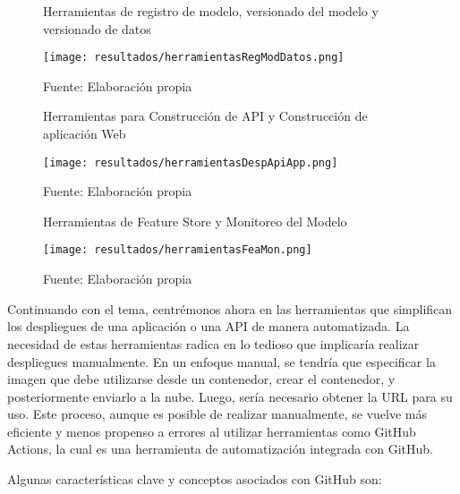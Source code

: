 \newpage

\begin{figure}[h]
	\centering
	\caption{Herramientas de registro de modelo, versionado del modelo y versionado de datos}
	\texttt{[image: resultados/herramientasRegModDatos.png]}
	\caption*{\footnotesize Fuente: Elaboración propia}
	\label{fig:figuraHerramientasRegModDatos}
\end{figure}

\begin{figure}[h]
	\centering
	\caption{Herramientas para Construcción de API y Construcción de aplicación Web}
	\texttt{[image: resultados/herramientasDespApiApp.png]}
	\caption*{\footnotesize Fuente: Elaboración propia}
	\label{fig:figuraHerramientasDespApiApp}
\end{figure}

\newpage

\begin{figure}[h]
	\centering
	\caption{Herramientas de Feature Store y Monitoreo del Modelo}
	\texttt{[image: resultados/herramientasFeaMon.png]}
	\caption*{\footnotesize Fuente: Elaboración propia}
	\label{fig:figuraHerramientasFeaMon}
\end{figure}

Continuando con el tema, centrémonos ahora en las herramientas que simplifican los despliegues de una aplicación o una API de manera automatizada. La necesidad de estas herramientas radica en lo tedioso que implicaría realizar despliegues manualmente. En un enfoque manual, se tendría que especificar la imagen que debe utilizarse desde un contenedor, crear el contenedor, y posteriormente enviarlo a la nube. Luego, sería necesario obtener la URL para su uso. Este proceso, aunque es posible de realizar manualmente, se vuelve más eficiente y menos propenso a errores al utilizar herramientas como GitHub Actions, la cual es una herramienta de automatización integrada con GitHub.

Algunas características clave y conceptos asociados con GitHub son:

